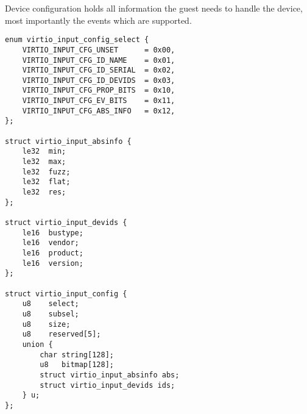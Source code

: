 Device configuration holds all information the guest needs to handle
the device, most importantly the events which are supported.

\begin{lstlisting}
enum virtio_input_config_select {
	VIRTIO_INPUT_CFG_UNSET      = 0x00,
	VIRTIO_INPUT_CFG_ID_NAME    = 0x01,
	VIRTIO_INPUT_CFG_ID_SERIAL  = 0x02,
	VIRTIO_INPUT_CFG_ID_DEVIDS  = 0x03,
	VIRTIO_INPUT_CFG_PROP_BITS  = 0x10,
	VIRTIO_INPUT_CFG_EV_BITS    = 0x11,
	VIRTIO_INPUT_CFG_ABS_INFO   = 0x12,
};

struct virtio_input_absinfo {
	le32  min;
	le32  max;
	le32  fuzz;
	le32  flat;
	le32  res;
};

struct virtio_input_devids {
	le16  bustype;
	le16  vendor;
	le16  product;
	le16  version;
};

struct virtio_input_config {
	u8    select;
	u8    subsel;
	u8    size;
	u8    reserved[5];
	union {
		char string[128];
		u8   bitmap[128];
		struct virtio_input_absinfo abs;
		struct virtio_input_devids ids;
	} u;
};
\end{lstlisting}

